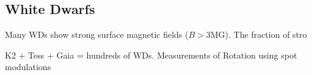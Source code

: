 {\color{red} \subsection{White Dwarfs}}
Many WDs show strong surface magnetic fields ($B>$3MG). The fraction of stro 

K2 + Tess + Gaia = hundreds of WDs. Measurements of Rotation using spot modulations